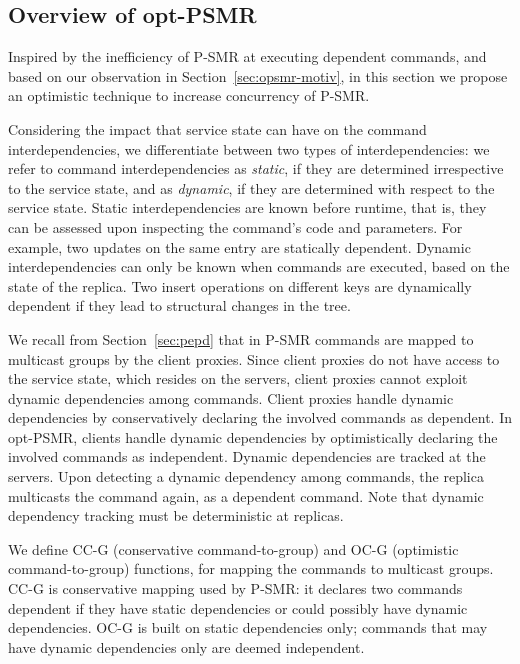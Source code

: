 \documentclass[conference]{IEEEtran}
\begin{document}
\subsection{Overview of opt-PSMR}
\label{sec:optpsmr-over}
Inspired by the inefficiency of P-SMR at executing dependent commands, and based on our observation in Section~\ref{sec:opsmr-motiv}, in this section we propose an optimistic technique to increase concurrency of P-SMR.  

Considering the impact that service state can have on the command interdependencies, we differentiate between two types of interdependencies: we refer to command interdependencies as \emph{static}, if they are determined irrespective to the service state, and as \emph{dynamic}, if they are determined with respect to the service state. 
Static interdependencies are known before runtime, that is, they can be assessed upon inspecting the command's code and parameters.
For example, two updates on the same entry are statically dependent.
Dynamic interdependencies can only be known when commands are executed, based on the state of the replica. 
Two insert operations on different keys are dynamically dependent if they lead to structural changes in the tree.

We recall from Section~\ref{sec:pepd} that in P-SMR commands are mapped to multicast groups by the client proxies.
Since client proxies do not have access to the service state, which resides on the servers, client proxies cannot exploit dynamic dependencies among commands.
Client proxies handle dynamic dependencies by conservatively declaring the involved commands as dependent.
In opt-PSMR, clients handle dynamic dependencies by optimistically declaring the involved commands as independent.
Dynamic dependencies are tracked at the servers.
Upon detecting a dynamic dependency among commands, the replica multicasts the command again, as a dependent command.
Note that dynamic dependency tracking must be deterministic at replicas.


We define CC-G (conservative command-to-group) and OC-G (optimistic command-to-group) functions, for mapping the commands to multicast groups. 
CC-G is conservative mapping used by P-SMR: it declares two commands dependent if they have static dependencies or could possibly have dynamic dependencies.
OC-G is built on static dependencies only; commands that may have dynamic dependencies only are deemed independent.
\end{document}
